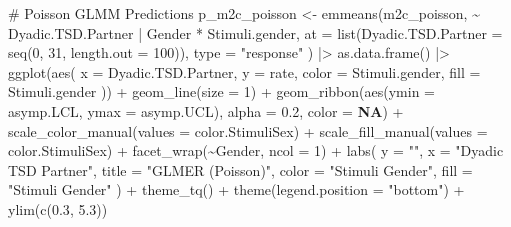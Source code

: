 \documentclass[
  bookmarksnumbered]{article}
\newenvironment{Shaded}{\begin{snugshade}}{\end{snugshade}}
\newcommand{\AttributeTok}[1]{\textcolor[rgb]{0.80,0.80,0.80}{#1}}
\newcommand{\CommentTok}[1]{\textcolor[rgb]{0.50,0.62,0.50}{#1}}
\newcommand{\ConstantTok}[1]{\textcolor[rgb]{0.86,0.64,0.64}{\textbf{#1}}}
\newcommand{\DecValTok}[1]{\textcolor[rgb]{0.86,0.86,0.80}{#1}}
\newcommand{\FloatTok}[1]{\textcolor[rgb]{0.75,0.75,0.82}{#1}}
\newcommand{\FunctionTok}[1]{\textcolor[rgb]{0.94,0.94,0.56}{#1}}
\newcommand{\NormalTok}[1]{\textcolor[rgb]{0.80,0.80,0.80}{#1}}
\newcommand{\OtherTok}[1]{\textcolor[rgb]{0.94,0.94,0.56}{#1}}
\newcommand{\SpecialCharTok}[1]{\textcolor[rgb]{0.86,0.64,0.64}{#1}}
\newcommand{\StringTok}[1]{\textcolor[rgb]{0.80,0.58,0.58}{#1}}
\begin{document}
\begin{Shaded}
\begin{Highlighting}[]
\CommentTok{\# Poisson GLMM Predictions}
\NormalTok{p\_m2c\_poisson }\OtherTok{\textless{}{-}} \FunctionTok{emmeans}\NormalTok{(m2c\_poisson, }\SpecialCharTok{\textasciitilde{}}\NormalTok{ Dyadic.TSD.Partner }\SpecialCharTok{|}\NormalTok{ Gender }\SpecialCharTok{*}\NormalTok{ Stimuli.gender,}
  \AttributeTok{at =} \FunctionTok{list}\NormalTok{(}\AttributeTok{Dyadic.TSD.Partner =} \FunctionTok{seq}\NormalTok{(}\DecValTok{0}\NormalTok{, }\DecValTok{31}\NormalTok{, }\AttributeTok{length.out =} \DecValTok{100}\NormalTok{)),}
  \AttributeTok{type =} \StringTok{"response"}
\NormalTok{) }\SpecialCharTok{|\textgreater{}}
  \FunctionTok{as.data.frame}\NormalTok{() }\SpecialCharTok{|\textgreater{}}
  \FunctionTok{ggplot}\NormalTok{(}\FunctionTok{aes}\NormalTok{(}
    \AttributeTok{x =}\NormalTok{ Dyadic.TSD.Partner, }\AttributeTok{y =}\NormalTok{ rate,}
    \AttributeTok{color =}\NormalTok{ Stimuli.gender, }\AttributeTok{fill =}\NormalTok{ Stimuli.gender}
\NormalTok{  )) }\SpecialCharTok{+}
  \FunctionTok{geom\_line}\NormalTok{(}\AttributeTok{size =} \DecValTok{1}\NormalTok{) }\SpecialCharTok{+}
  \FunctionTok{geom\_ribbon}\NormalTok{(}\FunctionTok{aes}\NormalTok{(}\AttributeTok{ymin =}\NormalTok{ asymp.LCL, }\AttributeTok{ymax =}\NormalTok{ asymp.UCL), }\AttributeTok{alpha =} \FloatTok{0.2}\NormalTok{, }\AttributeTok{color =} \ConstantTok{NA}\NormalTok{) }\SpecialCharTok{+}
  \FunctionTok{scale\_color\_manual}\NormalTok{(}\AttributeTok{values =}\NormalTok{ color.StimuliSex) }\SpecialCharTok{+}
  \FunctionTok{scale\_fill\_manual}\NormalTok{(}\AttributeTok{values =}\NormalTok{ color.StimuliSex) }\SpecialCharTok{+}
  \FunctionTok{facet\_wrap}\NormalTok{(}\SpecialCharTok{\textasciitilde{}}\NormalTok{Gender, }\AttributeTok{ncol =} \DecValTok{1}\NormalTok{) }\SpecialCharTok{+}
  \FunctionTok{labs}\NormalTok{(}
    \AttributeTok{y =} \StringTok{""}\NormalTok{, }\AttributeTok{x =} \StringTok{"Dyadic TSD Partner"}\NormalTok{,}
    \AttributeTok{title =} \StringTok{"GLMER (Poisson)"}\NormalTok{,}
    \AttributeTok{color =} \StringTok{"Stimuli Gender"}\NormalTok{, }\AttributeTok{fill =} \StringTok{"Stimuli Gender"}
\NormalTok{  ) }\SpecialCharTok{+}
  \FunctionTok{theme\_tq}\NormalTok{() }\SpecialCharTok{+}
  \FunctionTok{theme}\NormalTok{(}\AttributeTok{legend.position =} \StringTok{"bottom"}\NormalTok{) }\SpecialCharTok{+}
  \FunctionTok{ylim}\NormalTok{(}\FunctionTok{c}\NormalTok{(}\FloatTok{0.3}\NormalTok{, }\FloatTok{5.3}\NormalTok{))}


\end{Highlighting}
\end{Shaded}
\end{document}
